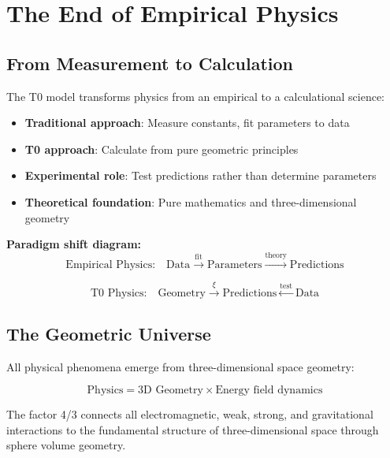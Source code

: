 \documentclass[12pt,a4paper]{report}
\begin{document}
\section{The End of Empirical Physics}
\label{sec:end_empirical_physics}

\subsection{From Measurement to Calculation}
\label{subsec:measurement_to_calculation}

The T0 model transforms physics from an empirical to a calculational science:

\begin{itemize}
	\item \textbf{Traditional approach}: Measure constants, fit parameters to data
	\item \textbf{T0 approach}: Calculate from pure geometric principles
	\item \textbf{Experimental role}: Test predictions rather than determine parameters
	\item \textbf{Theoretical foundation}: Pure mathematics and three-dimensional geometry
\end{itemize}

\textbf{Paradigm shift diagram:}
\begin{equation}
	\text{Empirical Physics:} \quad \text{Data} \xrightarrow{\text{fit}} \text{Parameters} \xrightarrow{\text{theory}} \text{Predictions}
\end{equation}

\begin{equation}
	\text{T0 Physics:} \quad \text{Geometry} \xrightarrow{\xi} \text{Predictions} \xleftarrow{\text{test}} \text{Data}
\end{equation}

\subsection{The Geometric Universe}
\label{subsec:geometric_universe}

All physical phenomena emerge from three-dimensional space geometry:

\begin{equation}
	\text{Physics} = \text{3D Geometry} \times \text{Energy field dynamics}
\end{equation}

The factor 4/3 connects all electromagnetic, weak, strong, and gravitational interactions to the fundamental structure of three-dimensional space through sphere volume geometry.
\end{document}
